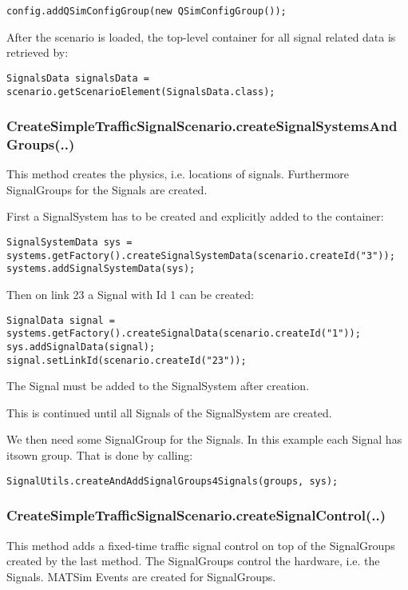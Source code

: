 \texttt{\nolinebreak config.addQSimConfigGroup(new QSimConfigGroup());}

After the scenario is loaded, the top-level container for all signal related data is retrieved by:


\texttt{\nolinebreak SignalsData signalsData = scenario.getScenarioElement(SignalsData.class);}

\subsubsection{CreateSimpleTrafficSignalScenario.createSignalSystemsAndGroups(..)}

This method creates the physics, i.e. locations of signals. Furthermore SignalGroups for the Signals are created.

First a SignalSystem has to be created and explicitly added to the container:


\texttt{\nolinebreak SignalSystemData sys = systems.getFactory().createSignalSystemData(scenario.createId("3"));
\\  \nolinebreak systems.addSignalSystemData(sys);}

Then on link 23 a Signal with Id 1 can be created:


\texttt{\nolinebreak SignalData signal = systems.getFactory().createSignalData(scenario.createId("1"));
\\\nolinebreak sys.addSignalData(signal);
\\\nolinebreak signal.setLinkId(scenario.createId("23"));}

The Signal must be added to the SignalSystem after creation.

This is continued until all Signals of the SignalSystem are created.

We then need some SignalGroup for the Signals. In this example each Signal has its\nolinebreak own group. That is done by calling:


\texttt{\nolinebreak SignalUtils.createAndAddSignalGroups4Signals(groups, sys);}

\subsubsection{CreateSimpleTrafficSignalScenario.createSignalControl(..)}

This method adds a fixed-time traffic signal control on top of the SignalGroups created by the last method. The SignalGroups control the hardware, i.e. the Signals. MATSim Events are created for SignalGroups.


